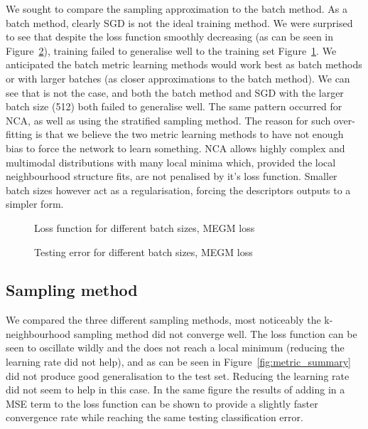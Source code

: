 We sought to compare the sampling approximation to the batch method.
As a batch method, clearly \gls{SGD} is not the ideal training method. We were
surprised to see that despite the loss function smoothly decreasing (as can be
seen in Figure~\ref{fig:metric_megm_test}), training failed to generalise well to the training set Figure~\ref{fig:metric_megm_loss}.
We anticipated the batch metric learning methods would work best as batch
methods or with larger batches (as closer approximations to the batch method).
We can see that is not the case, and both the batch method and \gls{SGD} with the
larger batch size (512) both failed to generalise well. The same pattern occurred
for \gls{NCA}, as well as using the stratified sampling method.
The reason for such over-fitting is that we believe the two metric learning
methods to have not enough bias to force the network to learn something. \gls{NCA}
allows highly complex and multimodal distributions with many local minima
which, provided the local neighbourhood structure fits, are not penalised by it’s
loss function. Smaller batch sizes however act as a regularisation, forcing the
descriptors outputs to a simpler form.



\begin{figure}[ht]
   
   \caption{Loss function for different batch sizes, MEGM loss}
   \label {fig:metric_megm_loss}
\end{figure}

\begin{figure}[ht]
   
   \caption{Testing error for different batch sizes, MEGM loss}
   \label {fig:metric_megm_test}
\end{figure}



\subsection{Sampling method}

We compared the three different sampling methods, most noticeably the k-neighbourhood sampling method did not converge well. The loss function can be seen to oscillate wildly and the does not reach a local minimum (reducing the learning rate did not help), and as can be seen in Figure~\ref{fig:metric_summary} did not produce good generalisation to the test set. Reducing the learning rate did not seem to help in this case. In the same figure the results of adding in a \gls{MSE} term to the loss function can be shown to provide a slightly faster convergence rate while reaching the same testing classification error.


